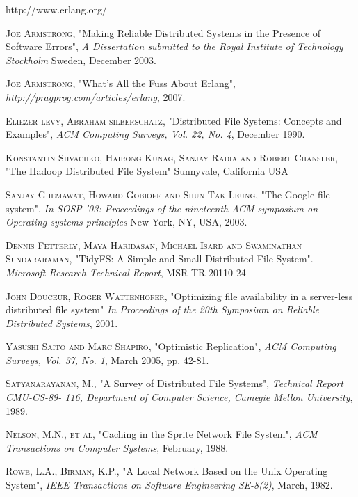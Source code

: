\documentclass[a4paper,12pt]{article}
\begin{document}
\begin{thebibliography}{99}
  http://www.erlang.org/

  \textsc{Joe Armstrong},
  "Making Reliable Distributed Systems in the Presence of Software Errors",
  \emph{A Dissertation submitted to the Royal Institute of Technology Stockholm}
  Sweden, December 2003.

  \textsc{Joe Armstrong},
  "What's All the Fuss About Erlang",
  \emph{http://pragprog.com/articles/erlang},
  2007.

  \textsc{Eliezer levy, Abraham silberschatz},
  "Distributed File Systems: Concepts and Examples",
  \emph{ACM Computing Surveys, Vol. 22, No. 4},
  December 1990.

  \textsc{Konstantin Shvachko, Hairong Kunag, Sanjay Radia and Robert Chansler},
  "The Hadoop Distributed File System"
  Sunnyvale, California USA

  \textsc{Sanjay Ghemawat, Howard Gobioff and Shun-Tak Leung},
  "The Google file system",
  \emph{In SOSP '03: Proceedings of the nineteenth ACM symposium on Operating systems principles}
  New York, NY, USA, 2003.

  \textsc{Dennis Fetterly, Maya Haridasan, Michael Isard and Swaminathan Sundararaman},
  "TidyFS: A Simple and Small Distributed File System".
  \emph{Microsoft Research Technical Report},
  MSR-TR-20110-24



  \textsc{John Douceur, Roger Wattenhofer},
  "Optimizing file availability in a server-less distributed file system"
  \emph{In Proceedings of the 20th Symposium on Reliable Distributed Systems},
  2001.

  \textsc{Yasushi Saito and Marc Shapiro},
  "Optimistic Replication",
  \emph{ACM Computing Surveys, Vol. 37, No. 1},
  March 2005, pp. 42-81.

  \textsc{Satyanarayanan, M.},
  "A Survey of Distributed File Systems",
  \emph{Technical Report CMU-CS-89- 116, Department of Computer Science, Camegie Mellon University},
  1989.

  \textsc{Nelson, M.N., et al},
  "Caching in the Sprite Network File System",
  \emph{ACM Transactions on Computer Systems},
  February, 1988.

  \textsc{Rowe, L.A., Birman, K.P.},
  "A Local Network Based on the Unix Operating System",
  \emph{IEEE Transactions on Software Engineering SE-8(2)},
  March, 1982.


\end{thebibliography}
\end{document}
